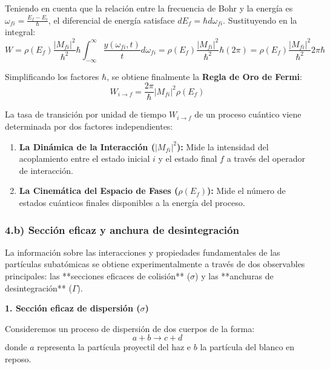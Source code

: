 Teniendo en cuenta que la relación entre la frecuencia de Bohr y la energía es $\omega_{fi} = \frac{E_f - E_i}{\hbar}$, el diferencial de energía satisface $dE_f = \hbar d\omega_{fi}$. Sustituyendo en la integral:
\begin{equation}
W = \rho(E_f) \frac{|M_{fi}|^2}{\hbar^2} \hbar \int_{-\infty}^{\infty} \frac{y(\omega_{fi}, t)}{t} d\omega_{fi} = \rho(E_f) \frac{|M_{fi}|^2}{\hbar^2} \hbar (2\pi) = \rho(E_f) \frac{|M_{fi}|^2}{\hbar^2} 2\pi\hbar
\end{equation}

Simplificando los factores $\hbar$, se obtiene finalmente la \textbf{Regla de Oro de Fermi}:
\begin{equation}
W_{i \to f} = \frac{2\pi}{\hbar} |M_{fi}|^2 \rho(E_f)
\end{equation}

\begin{concepto}
La tasa de transición por unidad de tiempo $W_{i \to f}$ de un proceso cuántico viene determinada por dos factores independientes:
\begin{enumerate}[label=\arabic*)]
    \item \textbf{La Dinámica de la Interacción ($|M_{fi}|^2$):} Mide la intensidad del acoplamiento entre el estado inicial $i$ y el estado final $f$ a través del operador de interacción.
    \item \textbf{La Cinemática del Espacio de Fases ($\rho(E_f)$):} Mide el número de estados cuánticos finales disponibles a la energía del proceso.
\end{enumerate}
\end{concepto}

\newpage

\subsubsection*{4.b) Sección eficaz y anchura de desintegración}

La información sobre las interacciones y propiedades fundamentales de las partículas subatómicas se obtiene experimentalmente a través de dos observables principales: las **secciones eficaces de colisión** ($\sigma$) y las **anchuras de desintegración** ($\Gamma$).

\textbf{1. Sección eficaz de dispersión ($\sigma$)}

Consideremos un proceso de dispersión de dos cuerpos de la forma:
\begin{equation}
a + b \longrightarrow c + d
\end{equation}
donde $a$ representa la partícula proyectil del haz e $b$ la partícula del blanco en reposo.

